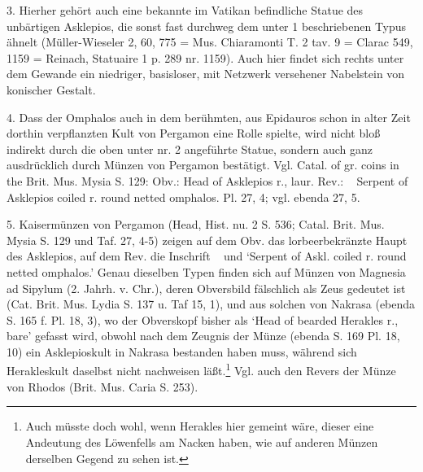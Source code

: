 \documentclass[a4paper, 11pt, oneside]{article}
\newcommand*\svgABN{}
\newcommand*\svgABO{}
\newcommand*\svgABP{}
\newcommand*\svgABQ{}
\begin{document}
3. Hierher gehört auch eine bekannte im Vatikan befindliche Statue des unbärtigen Asklepios, die sonst fast durchweg dem unter 1 beschriebenen Typus ähnelt (Müller-Wieseler 2, 60, 775 = Mus. Chiaramonti T. 2 tav. 9 = Clarac 549, 1159 = Reinach, Statuaire 1 p. 289 nr. 1159). Auch hier findet sich rechts unter dem Gewande ein niedriger, basisloser, mit Netzwerk versehener Nabelstein von konischer Gestalt.

4. Dass der Omphalos auch in dem berühmten, aus Epidauros schon in alter Zeit dorthin verpflanzten Kult von Pergamon eine Rolle spielte, wird nicht bloß indirekt durch die oben unter nr. 2 angeführte Statue, sondern auch ganz ausdrücklich durch Münzen von Pergamon bestätigt. Vgl. Catal. of gr. coins in the Brit. Mus. Mysia S. 129: Obv.: Head of Asklepios r., laur. Rev.: $\svgABN\enspace\svgABO$ Serpent of Asklepios coiled r. round netted omphalos. Pl. 27, 4; vgl. ebenda 27, 5.

5. Kaisermünzen von Pergamon (Head, Hist. nu. 2 S. 536; Catal. Brit. Mus. Mysia S. 129 und Taf. 27, 4-5) zeigen auf dem Obv. das lorbeerbekränzte Haupt des Asklepios, auf dem Rev. die Inschrift $\svgABP\enspace\svgABQ$ und `Serpent of Askl. coiled r. round netted omphalos.' Genau dieselben Typen finden sich auf Münzen von Magnesia ad Sipylum (2. Jahrh. v. Chr.), deren Obversbild fälschlich als Zeus gedeutet ist (Cat. Brit. Mus. Lydia S. 137 u. Taf 15, 1), und aus solchen von Nakrasa (ebenda S. 165 f. Pl. 18, 3), wo der Obverskopf bisher als `Head of bearded Herakles r., bare' gefasst wird, obwohl nach dem Zeugnis der Münze (ebenda S. 169 Pl. 18, 10) ein Asklepioskult in Nakrasa bestanden haben muss, während sich Herakleskult daselbst nicht nachweisen läßt.\footnote{Auch müsste doch wohl, wenn Herakles hier gemeint wäre, dieser eine Andeutung des Löwenfells am Nacken haben, wie auf anderen Münzen derselben Gegend zu sehen ist.} Vgl. auch den Revers der Münze von Rhodos (Brit. Mus. Caria S. 253).
\end{document}
